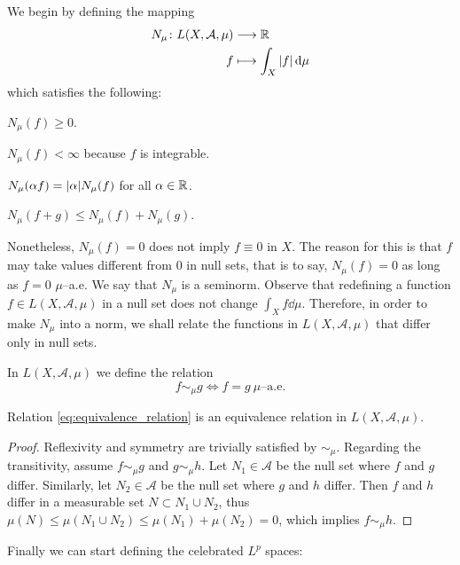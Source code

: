 We begin by defining the mapping
\[
	\begin{aligned}
		N_\mu \colon L(X, \mathcal{A}, \mu) &\longrightarrow \mathbb{R} \\
		f &\longmapsto \int_X \abs{f} \dd{\mu}
	\end{aligned}
\]
which satisfies the following:
\begin{enumerateprop}
	\item $N_\mu(f) \geq 0$.
	\item $N_\mu(f) < \infty$ because $f$ is integrable.
	\item $N_\mu(\alpha f) = \abs{\alpha} N_\mu(f)$ for all $\alpha \in \mathbb{R}$.
	\item $N_\mu(f + g) \leq N_\mu(f) + N_\mu(g)$.
\end{enumerateprop}
Nonetheless, $N_\mu(f) = 0$ does not imply $f \equiv 0$ in $X$. The reason for
this is that $f$ may take values different from $0$ in null sets, that is to
say, $N_\mu(f) = 0$ as long as $f = 0$ $\mu$--a.e. We say that $N_\mu$ is a
seminorm. Observe that redefining a function $f \in L(X, \mathcal{A}, \mu)$ in a
null set does not change $\int_X f \dd{\mu}$. Therefore, in order to make
$N_\mu$ into a norm, we shall relate the functions in $L(X, \mathcal{A}, \mu)$
that differ only in null sets.

\begin{definition*}
	In $L(X, \mathcal{A}, \mu)$ we define the relation
	\begin{equation} \label{eq:equivalence_relation}
		f \sim_\mu g \iff f = g \ \mu\text{--a.e.}	
	\end{equation}
\end{definition*}

\begin{prop}
	Relation \eqref{eq:equivalence_relation} is an equivalence relation in $L(X, \mathcal{A}, \mu)$. 
\end{prop}
\begin{proof}
	Reflexivity and symmetry are trivially satisfied by $\sim_\mu$. Regarding
	the transitivity, assume $f \sim_\mu g$ and $g \sim_\mu h$. Let $N_1 \in
	\mathcal{A}$ be the null set where $f$ and $g$ differ. Similarly, let $N_2
	\in \mathcal{A}$ be the null set where $g$ and $h$ differ. Then $f$ and $h$
	differ in a measurable set $N \subset N_1 \cup N_2$, thus $\mu(N) \leq
	\mu(N_1 \cup N_2) \leq \mu(N_1) + \mu(N_2) = 0$, which implies $f \sim_\mu h$.
\end{proof}

Finally we can start defining the celebrated $L^p$ spaces:

